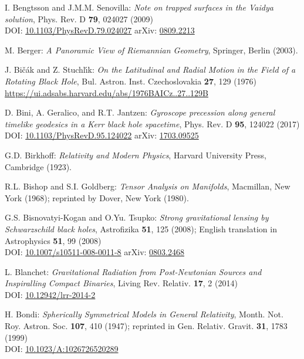 \begin{thebibliography}{123}
I. Bengtsson and J.M.M. Senovilla:
{\em Note on trapped surfaces in the Vaidya solution},
Phys. Rev. D {\bf 79}, 024027 (2009)\\
DOI: \href{https://doi.org/10.1103/PhysRevD.79.024027}{10.1103/PhysRevD.79.024027}\hfill
arXiv: \href{https://arxiv.org/abs/0809.2213}{0809.2213}

M. Berger: {\em A Panoramic View of Riemannian Geometry},
Springer, Berlin (2003).

J. Bi\v{c}\'{a}k and Z. Stuchl\'{\i}k:
{\em On the Latitudinal and Radial Motion in the Field of a Rotating Black Hole},
Bul. Astron. Inst. Czechoslovakia {\bf 27}, 129 (1976)\\
\url{https://ui.adsabs.harvard.edu/abs/1976BAICz..27..129B}

D. Bini, A. Geralico, and R.T. Jantzen:
{\em Gyroscope precession along general timelike geodesics in a Kerr black hole spacetime},
Phys. Rev. D {\bf 95}, 124022 (2017)\\
DOI: \href{https://doi.org/10.1103/PhysRevD.95.124022}{10.1103/PhysRevD.95.124022}\hfill
arXiv: \href{https://arxiv.org/abs/1703.09525}{1703.09525}

G.D. Birkhoff:
{\em Relativity and Modern Physics},
Harvard University Press, Cambridge (1923).

R.L. Bishop and S.I. Goldberg:
{\em Tensor Analysis on Manifolds},
Macmillan, New York (1968); reprinted by Dover, New York (1980).

G.S. Bisnovatyi-Kogan and O.Yu. Tsupko:
{\em Strong gravitational lensing by Schwarzschild black holes},
Astrofizika {\bf 51}, 125 (2008); English translation in
Astrophysics {\bf 51}, 99 (2008)\\
DOI: \href{https://doi.org/10.1007/s10511-008-0011-8}{10.1007/s10511-008-0011-8}\hfill
arXiv: \href{https://arxiv.org/abs/0803.2468}{0803.2468}

L. Blanchet:
{\em Gravitational Radiation from Post-Newtonian Sources and Inspiralling Compact Binaries},
Living Rev. Relativ. {\bf 17}, 2 (2014)\\
DOI: \href{https://doi.org/10.12942/lrr-2014-2}{10.12942/lrr-2014-2}\hfill

H. Bondi:
{\em Spherically Symmetrical Models in General Relativity},
Month. Not. Roy. Astron. Soc. {\bf 107}, 410 (1947);
reprinted in
Gen. Relativ. Gravit. {\bf 31}, 1783 (1999)\\
DOI: \href{https://doi.org/10.1023/A:1026726520289}{10.1023/A:1026726520289}


\end{thebibliography}
